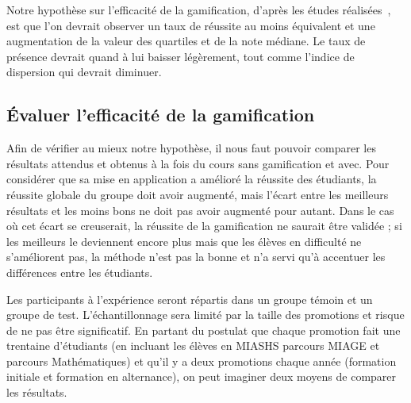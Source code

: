 Notre hypothèse sur l'efficacité de la gamification, d'après les études réalisées~\cite{gamif-educ}, est que l'on devrait observer un taux de réussite au moins équivalent et une augmentation de la valeur des quartiles et de la note médiane. Le taux de présence devrait quand à lui baisser légèrement, tout comme l'indice de dispersion qui devrait diminuer.

\subsection{Évaluer l'efficacité de la gamification}
Afin de vérifier au mieux notre hypothèse, il nous faut pouvoir comparer les résultats attendus et obtenus à la fois du cours sans gamification et avec. Pour considérer que sa mise en application a amélioré la réussite des étudiants, la réussite globale du groupe doit avoir augmenté, mais l'écart entre les meilleurs résultats et les moins bons ne doit pas avoir augmenté pour autant. Dans le cas où cet écart se creuserait, la réussite de la gamification ne saurait être validée ; si les meilleurs le deviennent encore plus mais que les élèves en difficulté ne s'améliorent pas, la méthode n'est pas la bonne et n'a servi qu'à accentuer les différences entre les étudiants. \par

Les participants à l'expérience seront répartis dans un groupe témoin et un groupe de test. L'échantillonnage sera limité par la taille des promotions et risque de ne pas être significatif. En partant du postulat que chaque promotion fait une trentaine d'étudiants (en incluant les élèves en MIASHS parcours MIAGE et parcours Mathématiques) et qu'il y a deux promotions chaque année (formation initiale et formation en alternance), on peut imaginer deux moyens de comparer les résultats. \par

